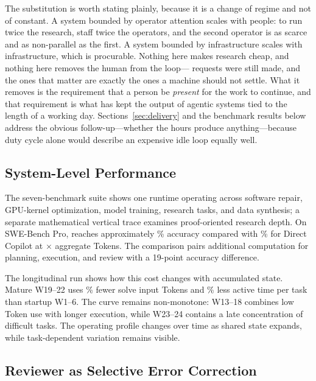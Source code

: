 The substitution is worth stating plainly, because it is a change of regime and not
of constant. A system bounded by operator attention scales with people: to run twice
the research, staff twice the operators, and the second operator is as scarce and as
non-parallel as the first. A system bounded by infrastructure scales with
infrastructure, which is procurable. Nothing here makes research cheap, and nothing
here removes the human from the loop---\DutyInterruptions{} requests were still made,
and the ones that matter are exactly the ones a machine should not settle. What it
removes is the requirement that a person be \emph{present} for the work to continue,
and that requirement is what has kept the output of agentic systems tied to the
length of a working day. Sections~\ref{sec:delivery} and the benchmark results below
address the obvious follow-up---whether the hours produce anything---because duty
cycle alone would describe an expensive idle loop equally well.

\subsection{System-Level Performance}

The seven-benchmark suite shows one runtime operating across software repair,
GPU-kernel optimization, model training, research tasks, and data synthesis; a
separate mathematical vertical trace examines proof-oriented research depth. On
SWE-Bench Pro, \systemname reaches approximately \SWEProArgusAccuracy\%
accuracy compared with \SWEProDirectAccuracy\% for Direct Copilot at \SWEProTokenRatio$\times$ aggregate Tokens.
The comparison pairs additional computation for planning, execution, and review
with a 19-point accuracy difference.

The longitudinal run shows how this cost changes with accumulated state. Mature
W19--22 uses \SWEProTokenReduction\% fewer solve input Tokens and \SWEProTimeReduction\% less active time per task than
startup W1--6. The curve remains non-monotone: W13--18 combines low Token use with
longer execution, while W23--24 contains a late concentration of difficult tasks. The operating profile changes
over time as shared state expands, while task-dependent variation remains visible.

\subsection{Reviewer as Selective Error Correction}

